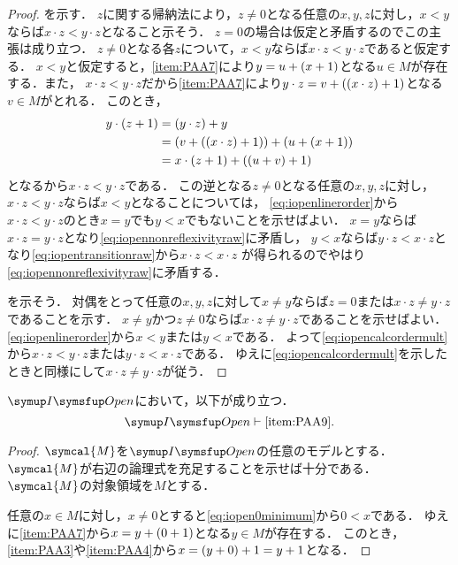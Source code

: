 \begin{proof}
	を示す．
	\(z\)に関する帰納法により，\(z \neq 0\)となる任意の\(x, y, z\)に対し，\(x < y\)ならば\(x \cdot z < y \cdot z\)となること示そう．
	\(z = 0\)の場合は仮定と矛盾するのでこの主張は成り立つ．
	\(z \neq 0\)となる各\(z\)について，\(x < y\)ならば\(x \cdot z < y \cdot z\)であると仮定する．
	\(x < y\)と仮定すると，\cref{item:PAA7}により\(y = u + \paren{x + 1}\)となる\(u \in M\)が存在する．また，
	\(x \cdot z < y \cdot z\)だから\cref{item:PAA7}により\(y \cdot z = v + \paren{\paren{x \cdot z} + 1}\)となる\(v \in M\)がとれる．
	このとき，
	\begin{align*}
		y \cdot \paren{z + 1}
		 & = \paren{y \cdot z} + y                                                 \\
		 & = \paren{v + \paren{\paren{x \cdot z} + 1}} + \paren{u + \paren{x + 1}} \\
		 & = x \cdot \paren{z + 1} + \paren{\paren{u + v} + 1}
	\end{align*}
	となるから\(x \cdot z < y \cdot z\)である．
	この逆となる\(z \neq 0\)となる任意の\(x, y, z\)に対し，\(x \cdot z < y \cdot z\)ならば\(x < y\)となることについては，
	\cref{eq:iopenlinerorder}から\(x \cdot z < y \cdot z\)のとき\(x = y\)でも\(y < x\)でもないことを示せばよい．
	\(x = y\)ならば\(x \cdot z = y \cdot z\)となり\cref{eq:iopennonreflexivityraw}に矛盾し，
	\(y < x\)ならば\(y \cdot z < x \cdot z\)となり\cref{eq:iopentransitionraw}から\(x \cdot z < x \cdot z\)
	が得られるのでやはり\cref{eq:iopennonreflexivityraw}に矛盾する．

	を示そう．
	対偶をとって任意の\(x, y, z\)に対して\(x \neq y\)ならば\(z = 0\)または\(x \cdot z \neq y \cdot z\)であることを示す．
	\(x \neq y\)かつ\(z \neq 0\)ならば\(x \cdot z \neq y \cdot z\)であることを示せばよい．
	\cref{eq:iopenlinerorder}から\(x < y\)または\(y < x\)である．
	よって\cref{eq:iopencalcordermult}から\(x \cdot z < y \cdot z\)または\(y \cdot z < x \cdot z\)である．
	ゆえに\cref{eq:iopencalcordermult}を示したときと同様にして\(x \cdot z \neq y \cdot z\)が従う．
\end{proof}

\begin{Lemma} \label{Lemma:iopenPAA9redudant}
	\(\OpenFormulaInduction\)において，以下が成り立つ．
	\begin{equation}
		\OpenFormulaInduction \provable \text{\cref{item:PAA9}}.
		\label{eq:iopenPAA9redudant}
	\end{equation}
\end{Lemma}

\begin{proof}
	\(\symcal{M}\)を\(\OpenFormulaInduction\)の任意のモデルとする．\(\symcal{M}\)が右辺の論理式を充足することを示せば十分である．
	\(\symcal{M}\)の対象領域を\(M\)とする．

	任意の\(x \in M\)に対し，\(x \neq 0\)とすると\cref{eq:iopen0minimum}から\(0 < x\)である．
	ゆえに\cref{item:PAA7}から\(x = y + \paren{0 + 1}\)となる\(y \in M\)が存在する．
	このとき，\cref{item:PAA3}や\cref{item:PAA4}から\(x = \paren{y + 0} + 1 = y + 1\)となる．
\end{proof}